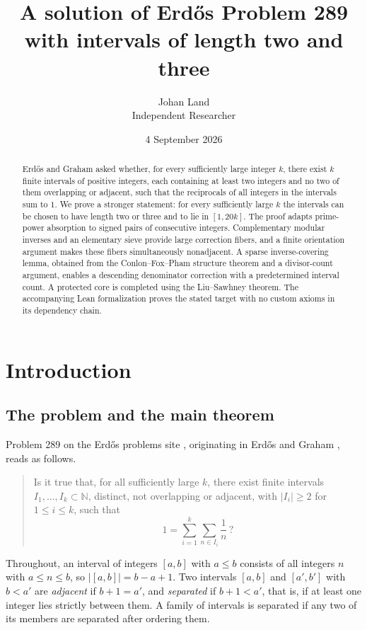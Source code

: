 \documentclass[11pt,letterpaper]{article}
\title{A solution of Erd\H{o}s Problem 289\\ with intervals of length two and three}
\author{Johan Land\\ \small Independent Researcher}
\date{4 September 2026}
\numberwithin{equation}{section}
\theoremstyle{plain}
\theoremstyle{remark}
\newcommand{\N}{\mathbb N}
\begin{document}
\maketitle

\begin{abstract}
Erd\H{o}s and Graham asked whether, for every sufficiently large integer $k$, there exist $k$ finite intervals of positive integers, each containing at least two integers and no two of them overlapping or adjacent, such that the reciprocals of all integers in the intervals sum to $1$. We prove a stronger statement: for every sufficiently large $k$ the intervals can be chosen to have length two or three and to lie in $[1,20k]$. The proof adapts prime-power absorption to signed pairs of consecutive integers. Complementary modular inverses and an elementary sieve provide large correction fibers, and a finite orientation argument makes these fibers simultaneously nonadjacent. A sparse inverse-covering lemma, obtained from the Conlon--Fox--Pham structure theorem and a divisor-count argument, enables a descending denominator correction with a predetermined interval count. A protected core is completed using the Liu--Sawhney theorem. The accompanying Lean formalization proves the stated target with no custom axioms in its dependency chain.
\end{abstract}

\section{Introduction}\label{sec:intro}

\subsection{The problem and the main theorem}\label{sec:problem}

Problem 289 on the Erd\H{o}s problems site \cite{EP289}, originating in Erd\H{o}s and Graham \cite{EG80}, reads as follows.

\begin{quote}
Is it true that, for all sufficiently large $k$, there exist finite intervals $I_1,\ldots,I_k\subset\N$, distinct, not overlapping or adjacent, with $|I_i|\ge2$ for $1\le i\le k$, such that
\[
1=\sum_{i=1}^k\sum_{n\in I_i}\frac1n\,?
\]
\end{quote}

Throughout, an interval of integers $[a,b]$ with $a\le b$ consists of all integers $n$ with $a\le n\le b$, so $|[a,b]|=b-a+1$. Two intervals $[a,b]$ and $[a',b']$ with $b<a'$ are \emph{adjacent} if $b+1=a'$, and \emph{separated} if $b+1<a'$, that is, if at least one integer lies strictly between them. A family of intervals is separated if any two of its members are separated after ordering them.
\end{document}
